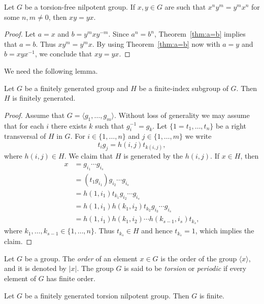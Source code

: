 \begin{corollary}
	Let $G$ be a torsion-free nilpotent group. If $x,y\in G$ are such that 
	$x^ny^m=y^mx^n$ for some $n,m\ne 0$, then $xy=yx$.
\end{corollary}

\begin{proof}
	Let $a=x$ and $b=y^mxy^{-m}$. Since $a^n=b^n$, Theorem~\ref{thm:a=b} implies that $a=b$. Thus $xy^m=y^mx$. 
	By using Theorem~\ref{thm:a=b} now with $a=y$ and $b=xyx^{-1}$, we conclude that 
	$xy=yx$. 
\end{proof}

We need the following lemma. 

\begin{lemma}
	\label{lem:fg}
	Let $G$ be a finitely generated group and $H$ be a finite-index subgroup of $G$. 
	Then $H$ is finitely generated. 
\end{lemma}

\begin{proof}
	Assume that $G=\langle g_1,\dots,g_m\rangle$. Without loss of generality we may assume that 
	for each $i$ there exists $k$ such that $g_i^{-1}=g_k$. 
	Let $\{1=t_1,\dots,t_n\}$ be a right transversal of $H$ in $G$. For 
	$i\in\{1,\dots,n\}$ and 
	$j\in\{1,\dots,m\}$ we write 
	\[
		t_ig_j=h(i,j)t_{k(i,j)},
	\]
	where $h(i,j)\in H$.
	We claim that $H$ is generated by the $h(i,j)$. If $x\in H$, then 
	\begin{align*}
	x &=g_{i_1}\cdots g_{i_s}\\
	&= (t_1g_{i_1})g_{i_2}\cdots g_{i_s}\\
	&= h(1,i_1)t_{k_1}g_{i_2}\cdots g_{i_s}\\
	&= h(1,i_1)h(k_1,i_2)t_{k_2}g_{i_3}\cdots g_{i_s}\\
	&= h(1,i_1)h(k_1,i_2)\cdots h(k_{s-1},i_s)t_{k_s},
	\end{align*}
	where $k_1,\dots,k_{s-1}\in\{1,\dots,n\}$. Thus $t_{k_s}\in H$ and hence 
	$t_{k_s}=1$, which implies the claim.  
\end{proof}

Let $G$ be a group. The {\em order} of an element $x\in G$ is the order of the group $\langle x\rangle$, and it is denoted by $|x|$.  The group $G$ is said to be {\em torsion} or {\em periodic} if every element of $G$ has finite order.


\begin{theorem}
	\label{thm:T(G)finito}
	Let $G$ be a finitely generated torsion nilpotent group. Then
	$G$ is finite.  	
\end{theorem}

